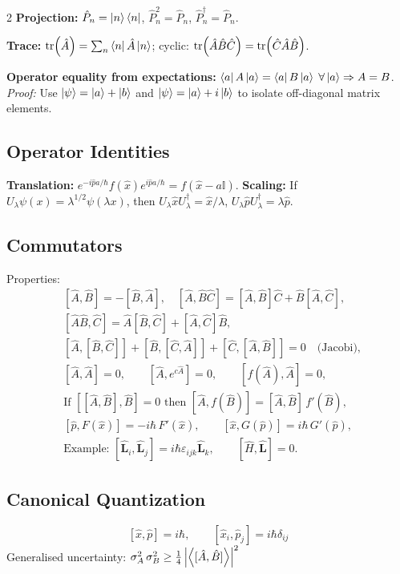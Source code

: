 \documentclass[9pt,a4paper]{article} %
\newcommand{\Hhat}{\hat{H}}
\newcommand{\phat}{\hat{p}}
\newcommand{\xhat}{\hat{x}}
\newcommand{\Lop}{\hat{\mathbf{L}}}
\newcommand{\Id}{\mathbb{I}}
\begin{document}
\begin{multicols}{2}
    \textbf{Projection:} $\hat{P}_n=\ket{n}\bra{n}$, $\hat{P}_n^2=\hat{P}_n$, $\hat{P}_n^\dagger=\hat{P}_n$.

    \textbf{Trace:} $\tr(\hat{A})=\sum_{n}\bra{n}\hat{A}\ket{n}$; cyclic: $\tr(\hat{A}\hat{B}\hat{C})=\tr(\hat{C}\hat{A}\hat{B})$.

    \textbf{Operator equality from expectations:}
$\bra{a}A\ket{a}=\bra{a}B\ket{a}\;\forall\ket{a}\Rightarrow A=B$.
    \textit{Proof:} Use $\ket{\psi}=\ket{a}+\ket{b}$ and $\ket{\psi}=\ket{a}+i\ket{b}$ to isolate off-diagonal matrix elements.

\subsection{Operator Identities}
\textbf{Translation:} $e^{-i\hat{p}a/\hbar} f(\hat{x}) e^{i\hat{p}a/\hbar} = f(\hat{x}-a\Id)$.
\textbf{Scaling:} If $U_\lambda \psi(x) = \lambda^{1/2}\psi(\lambda x)$, then $U_\lambda \hat{x} U_\lambda^\dagger = \hat{x}/\lambda$, $U_\lambda \hat{p} U_\lambda^\dagger = \lambda\hat{p}$.

\subsection{Commutators}
Properties:
\begin{align*}
&[\hat{A},\hat{B}]=-[\hat{B},\hat{A}],\quad
[\hat{A},\hat{B}\hat{C}]=[\hat{A},\hat{B}]\hat{C}+\hat{B}[\hat{A},\hat{C}],\\
&[\hat{A}\hat{B},\hat{C}]=\hat{A}[\hat{B},\hat{C}]+[\hat{A},\hat{C}]\hat{B},\\
&[\hat{A},[\hat{B},\hat{C}]]+[\hat{B},[\hat{C},\hat{A}]]+[\hat{C},[\hat{A},\hat{B}]]=0 \quad\text{(Jacobi)},\\
&[\hat{A},\hat{A}]=0,\qquad [\hat{A},e^{c\hat{A}}]=0,\qquad [f(\hat{A}),\hat{A}]=0,\\
&\text{If }[[\hat{A},\hat{B}],\hat{B}]=0\text{ then }[\hat{A},f(\hat{B})]=[\hat{A},\hat{B}]\,f'(\hat{B}),\\
&[\phat,F(\xhat)]=-i\hbar\,F'(\xhat),\qquad [\xhat,G(\phat)]=i\hbar\,G'(\phat),\\
&\text{Example: }[\Lop_i,\Lop_j]=i\hbar\varepsilon_{ijk}\Lop_k,\qquad [\Hhat,\Lop]=0.
\end{align*}

\subsection{Canonical Quantization}
\[
[\xhat,\phat]=i\hbar, \qquad [\xhat_i,\phat_j]=i\hbar\delta_{ij}
\]
Generalised uncertainty: $\sigma_A^2\,\sigma_B^2\ge\frac{1}{4}\left|\ev{[\hat{A},\hat{B}]}\right|^{2}$


\end{multicols}
\end{document}
